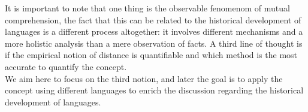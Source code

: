 \documentclass[runningheads]{llncs}
\begin{document}
It is important to note that one thing is the observable fenomenom of mutual comprehension, the fact that this can be related to the historical development of languages is a different process altogether: it involves different mechanisms and a more holistic analysis than a mere observation of facts. A third line of thought is if the empirical notion of distance is quantifiable and which method is the most accurate to quantify the concept.\\

We aim here to focus on the third notion, and later the goal is to apply the concept using different languages to enrich the discussion regarding the historical development of languages.\\





\end{document}
